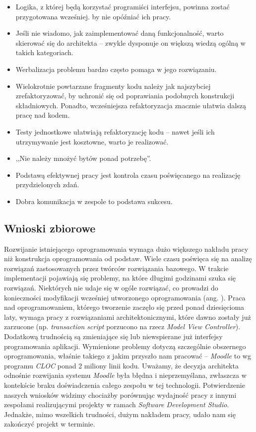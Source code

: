 \begin{description}
\begin{itemize}
\item Logika, z której będą korzystać programiści interfejsu, powinna zostać przygotowana wcześniej. by nie opóźniać ich pracy.
\item Jeśli nie wiadomo, jak zaimplementować daną funkcjonalność, warto skierować się do architekta -- zwykle dysponuje on większą wiedzą ogólną w takich kategoriach.
\item Werbalizacja problemu bardzo często pomaga w jego rozwiązaniu.
\item Wielokrotnie powtarzane fragmenty kodu należy jak najszybciej zrefaktoryzować, by uchronić się od poprawiania podobnych konstrukcji składniowych. Ponadto, wcześniejsza refaktoryzacja znacznie ułatwia dalszą pracę nad kodem.
\item Testy jednostkowe ułatwiają refaktoryzację kodu -- nawet jeśli ich utrzymywanie jest kosztowne, warto je realizować.
\item ,,Nie należy mnożyć bytów ponad potrzebę''.
\item Podstawą efektywnej pracy jest kontrola czasu poświęcanego na realizację przydzielonych zdań.
\item Dobra komunikacja w zespole to podstawa sukcesu.
\end{itemize}
\end{description}

\subsection{Wnioski zbiorowe}
\label{Chapter822}

Rozwijanie istniejącego oprogramowania wymaga dużo większego nakładu pracy niż konstrukcja oprogramowania od podstaw. Wiele czasu poświęca się na analizę rozwiązań zastosowanych przez twórców rozwiązania bazowego. W trakcie implementacji pojawiają się problemy, na które długimi godzinami szuka się rozwiązań. Niektórych nie udaje się w ogóle rozwiązać, co prowadzi do konieczności modyfikacji wcześniej utworzonego oprogramowania (ang. ). Praca nad oprogramowaniem, którego tworzenie zaczęło się przed ponad dziesięcioma laty, wymaga pracy z rozwiązaniami architektonicznymi, które dawno zostały już zarzucone (np. \textit{transaction script} porzucono na rzecz \textit{Model View Controller}). Dodatkową trudnością są zmieniające się lub niewspierane już interfejsy programowania aplikacji. Wymienione problemy dotyczą szczególnie obszernego oprogramowania, właśnie takiego z jakim przyszło nam pracować -- \textit{Moodle} to wg programu \textit{CLOC} ponad 2 miliony linii kodu. Uważamy, że decyzja architekta odnośnie rozwijania systemu \textit{Moodle} była błędna i nieprzemyślana, zwłaszcza w kontekście braku doświadczenia całego zespołu w tej technologii. Potwierdzenie naszych wniosków widzimy chociażby porównując wydajność pracy z innymi zespołami realizującymi projekty w ramach \textit{Software Development Studio}. Jednakże, mimo wszelkich trudności, dużym nakładem pracy, udało nam się zakończyć projekt w terminie.

